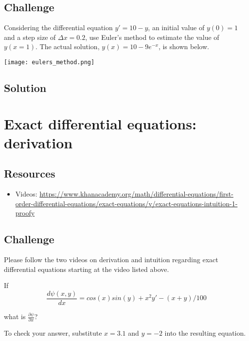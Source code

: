 \subsection*{Challenge}
Considering the differential equation $y'=10-y$, an initial value of $y(0)=1$ and a step size of $\Delta x = 0.2$, use Euler's method to estimate the value of $y(x=1)$. The actual solution, $y(x)=10-9e^{-x}$, is shown below.

\texttt{[image: eulers\_method.png]}

\subsection*{Solution}
\six{}

\timebox




\newpage
\section{Exact differential equations: derivation}

\subsection*{Resources}
\begin{itemize}
    \item Videos: \url{https://www.khanacademy.org/math/differential-equations/first-order-differential-equations/exact-equations/v/exact-equations-intuition-1-proofy}
\end{itemize}

\subsection*{Challenge}
Please follow the two videos on derivation and intuition regarding exact differential equations starting at the video listed above.

If
\begin{equation}
    \frac{d \psi(x,y)}{dx} = cos(x)sin(y) + x^2y' - (x+y)/100
\end{equation}

what is $\displaystyle \frac{\partial \psi}{\partial x}$?

To check your answer, substitute $x=3.1$ and $y=-2$ into the resulting equation.

